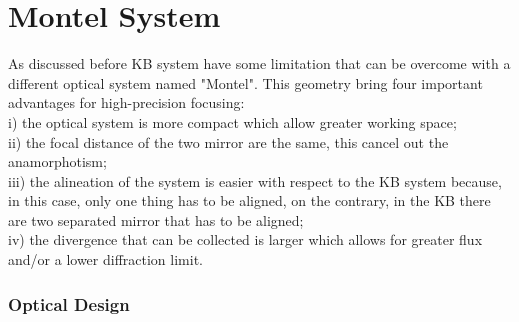 \chapter{Montel System}
\label{capitolo3}
\thispagestyle{empty}

\vspace{0.5cm}



\hspace{10mm} As discussed before KB system have some limitation that can be overcome with a different optical system named "Montel". This geometry bring four important advantages for high-precision focusing: 
\\ i) the optical system is more compact which allow greater working space;
\\ ii) the focal distance of the two mirror are the same, this cancel out  the anamorphotism;
\\ iii) the alineation of the system is easier with respect to the KB system because, in this case, only one thing has to be aligned, on the contrary, in the KB there are two separated mirror that has to be aligned;
\\ iv) the divergence that can be collected is larger which allows for greater flux and/or a lower diffraction limit.

\subsection{Optical Design}

